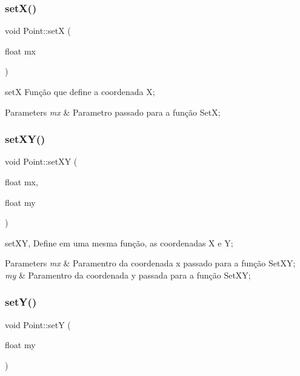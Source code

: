 \subsubsection{\texorpdfstring{set\+X()}{setX()}}
{\footnotesize\ttfamily void Point\+::setX (\begin{DoxyParamCaption}\item[{float}]{mx }\end{DoxyParamCaption})}



setX Função que define a coordenada X; 


\begin{DoxyParams}{Parameters}
{\em mx} & Parametro passado para a função SetX; \\
\hline
\end{DoxyParams}
\mbox{\label{class_point_afe2b937778d9fe5c135ab61de91271e9}} 
\subsubsection{\texorpdfstring{set\+X\+Y()}{setXY()}}
{\footnotesize\ttfamily void Point\+::set\+XY (\begin{DoxyParamCaption}\item[{float}]{mx,  }\item[{float}]{my }\end{DoxyParamCaption})}



set\+XY, Define em uma mesma função, as coordenadas X e Y; 


\begin{DoxyParams}{Parameters}
{\em mx} & Paramentro da coordenada x passado para a função Set\+XY; \\
\hline
{\em my} & Paramentro da coordenada y passada para a função Set\+XY; \\
\hline
\end{DoxyParams}
\mbox{\label{class_point_a756b3f64d961a5059302f42e1fcf2332}} 
\subsubsection{\texorpdfstring{set\+Y()}{setY()}}
{\footnotesize\ttfamily void Point\+::setY (\begin{DoxyParamCaption}\item[{float}]{my }\end{DoxyParamCaption})}



